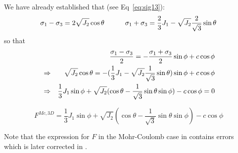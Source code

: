 We have already established that (see Eq~\ref{eq:sig13}):
\begin{eqnarray}
\sigma_1 - \sigma_3  = 2 \sqrt{J_2} \cos \theta \quad\quad\quad
\sigma_1 + \sigma_3  = \frac{2}{3}J_1 - \sqrt{J_2} \frac{2}{\sqrt{3}} \sin \theta \nonumber
\end{eqnarray}
so that 
\begin{eqnarray}
&& \frac{\sigma_1 - \sigma_3}{2} = -\frac{\sigma_1 + \sigma_3}{2} \sin \phi  + c \cos \phi \nonumber\\
&\Rightarrow&
\sqrt{J_2} \cos \theta = -(\frac{1}{3}J_1 - \sqrt{J_2} \frac{1}{\sqrt{3}} \sin \theta ) \sin \phi + c \cos \phi \nonumber\\
&\Rightarrow&
\frac{1}{3}J_1 \sin \phi  + \sqrt{J_2} ( \cos \theta - \frac{1}{\sqrt{3}} \sin \theta  \sin \phi ) - c \cos \phi = 0 \nonumber
\end{eqnarray}

\begin{mdframed}[backgroundcolor=blue!5]
\begin{equation}
F^{Mc,3D}=\frac{1}{3}J_1 \sin \phi  + 
\sqrt{J_2} \left( \cos \theta - \frac{1}{\sqrt{3}} \sin \theta  \sin \phi \right) - c \cos \phi 
\end{equation}
\end{mdframed}

Note that the expression for $F$ in the Mohr-Coulomb case in \cite{zico74} contains errors
which is later corrected in \cite[p102]{book_zitf}. 

